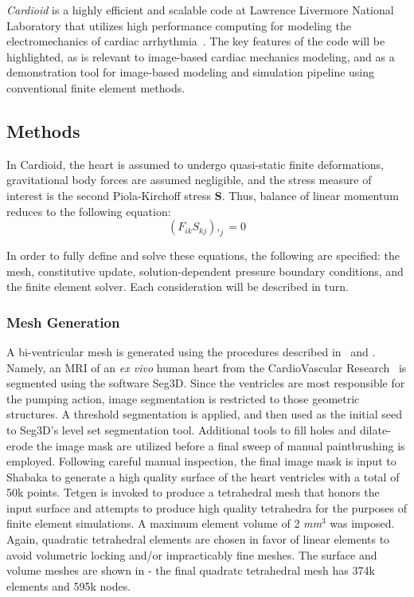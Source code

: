 \textit{Cardioid} is a highly efficient and scalable code at Lawrence Livermore National Laboratory that utilizes high performance computing for modeling the electromechanics of cardiac arrhythmia~\cite{richards_2013, gurev_2015}. The key features of the code will be highlighted, as is relevant to image-based cardiac mechanics modeling, and as a demonstration tool for image-based modeling and simulation pipeline using conventional finite element methods.

\subsection{Methods}
\label{Methods}

In Cardioid, the heart is assumed to undergo quasi-static finite deformations, gravitational body forces are assumed negligible, and the stress measure of interest is the second Piola-Kirchoff stress $\bm{S}$. Thus, balance of linear momentum reduces to the following equation:
\begin{equation}
(F_{ik}S_{kj}),_{j} = 0
\end{equation}

In order to fully define and solve these equations, the following are specified: the mesh, constitutive update, solution-dependent pressure boundary conditions, and the finite element solver. Each consideration will be described in turn.

\subsubsection{Mesh Generation}
\label{Mesh Generation}

A bi-ventricular mesh is generated using the procedures described in~ and . Namely, an MRI of an \textit{ex vivo} human heart from the CardioVascular Research~\cite{cvgg} is segmented using the software Seg3D. Since the ventricles are most responsible for the pumping action, image segmentation is restricted to those geometric structures. A threshold segmentation is applied, and then used as the initial seed to Seg3D's level set segmentation tool. Additional tools to fill holes and dilate-erode the image mask are utilized before a final sweep of manual paintbrushing is employed. Following careful manual inspection, the final image mask is input to Shabaka to generate a high quality surface of the heart ventricles with a total of 50k points. Tetgen is invoked to produce a tetrahedral mesh that honors the input surface and attempts to produce high quality tetrahedra for the purposes of finite element simulations. A maximum element volume of 2 \textit{mm$^3$} was imposed. Again, quadratic tetrahedral elements are chosen in favor of linear elements to avoid volumetric locking and/or impracticably fine meshes. The surface and volume meshes are shown in  - the final quadratc tetrahedral mesh has 374k elements and 595k nodes.


